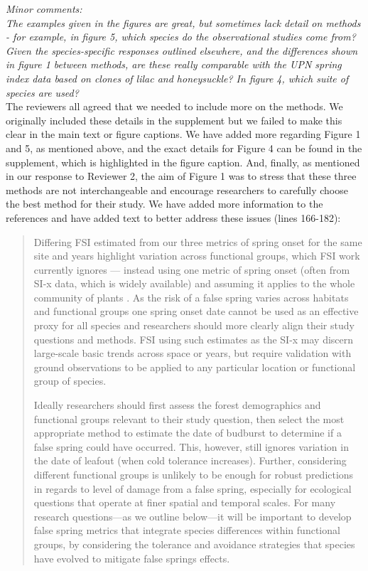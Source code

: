 \documentclass[11pt,a4paper]{article}
\begin{document}
\textit{Minor comments: \\
The examples given in the figures are great, but sometimes lack detail on methods - for example, in figure 5, which species do the observational studies come from?  Given the species-specific responses outlined elsewhere, and the differences shown in figure 1 between methods, are these really comparable with the UPN spring index data based on clones of lilac and honeysuckle?
In figure 4, which suite of species are used?} \\

The reviewers all agreed that we needed to include more on the methods. We originally included these details in the supplement but we failed to make this clear in the main text or figure captions. We have added more regarding Figure 1 and 5, as mentioned above, and the exact details for Figure 4 can be found in the supplement, which is highlighted in the figure caption. And, finally, as mentioned in our response to Reviewer 2, the aim of Figure 1 was to stress that these three methods are not interchangeable and encourage researchers to carefully choose the best method for their study. We have added more information to the references and have added text to better address these issues (lines 166-182): %

\begin{quotation}
Differing FSI estimated from our three metrics of spring onset for the same site and years highlight variation across functional groups, which FSI work currently ignores --- instead using one metric of spring onset (often from SI-x data, which is widely available) and assuming it applies to the whole community of plants \citep{Allstadt2015, Marino2011, Mehdipoor2017, Peterson2014}. As the risk of a false spring varies across habitats and functional groups \citep{Martin2010} one spring onset date cannot be used as an effective proxy for all species and researchers should more clearly align their study questions and methods. FSI using such estimates as the SI-x may discern large-scale basic trends across space or years, but require validation with ground observations to be applied to any particular location or functional group of species. 

Ideally researchers should first assess the forest demographics and functional groups relevant to their study question, then select the most appropriate method to estimate the date of budburst to determine if a false spring could have occurred. This, however, still ignores variation in the date of leafout (when cold tolerance increases). Further, considering different functional groups is unlikely to be enough for robust predictions in regards to level of damage from a false spring, especially for ecological questions that operate at finer spatial and temporal scales. For many research questions---as we outline below---it will be important to develop false spring metrics that integrate species differences within functional groups, by considering the tolerance and avoidance strategies that species have evolved to mitigate false springs effects.
\end{quotation}




\newpage

\end{document}

